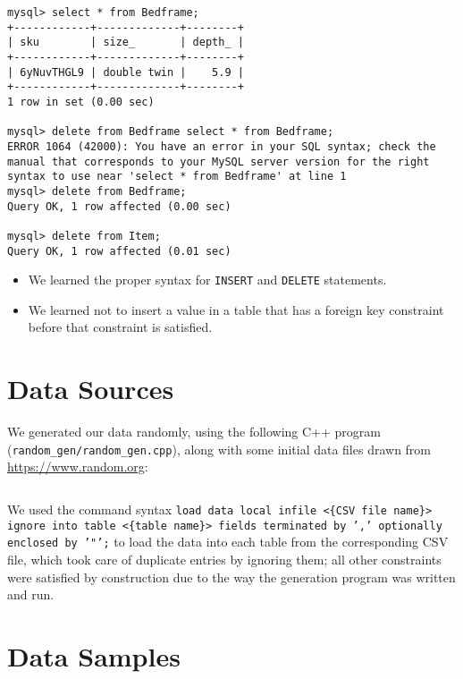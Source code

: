 \documentclass[american,extrafontsizes,12pt,portrait,letterpaper,oneside,onecolumn,article,final]{memoir}
\begin{document}
\begin{verbatim}
mysql> select * from Bedframe;
+------------+-------------+--------+
| sku        | size_       | depth_ |
+------------+-------------+--------+
| 6yNuvTHGL9 | double twin |    5.9 |
+------------+-------------+--------+
1 row in set (0.00 sec)

mysql> delete from Bedframe select * from Bedframe;
ERROR 1064 (42000): You have an error in your SQL syntax; check the manual that corresponds to your MySQL server version for the right syntax to use near 'select * from Bedframe' at line 1
mysql> delete from Bedframe;
Query OK, 1 row affected (0.00 sec)

mysql> delete from Item;
Query OK, 1 row affected (0.01 sec)
\end{verbatim}

\begin{itemize}[leftmargin=*]
\item We learned the proper syntax for \texttt{INSERT} and \texttt{DELETE} statements.
\item We learned not to insert a value in a table that has a foreign key constraint before that constraint is satisfied.
\end{itemize}

\section*{Data Sources}
%

We generated our data randomly, using the following C++ program (\texttt{random_gen/random_gen.cpp}), along with some initial data files drawn from \url{https://www.random.org}:

\inputminted[linenos,breaklines,breakbytokenanywhere]{c++}{random_gen/random_gen.cpp}

We used the command syntax \texttt{load data local infile <\textsf{\{CSV file name\}}> ignore into table <\textsf{\{table name\}}> fields terminated by ',' optionally enclosed by '"';} to load the data into each table from the corresponding CSV file, which took care of duplicate entries by ignoring them; all other constraints were satisfied by construction due to the way the generation program was written and run.

\section*{Data Samples}
%
\end{document}
